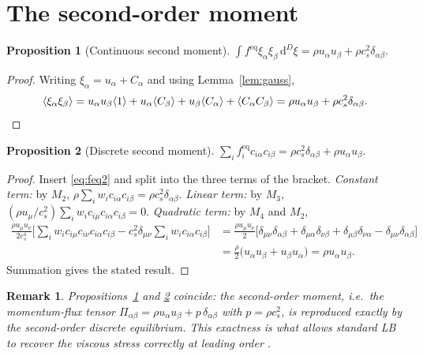 \documentclass[preprint,11pt]{elsarticle}
\newtheorem{proposition}{Proposition}
\newtheorem{remark}{Remark}
\newcommand{\cs}{c_s}
\newcommand{\eq}{\mathrm{eq}}
\newcommand{\dd}{\,\mathrm{d}}
\newcommand{\sumi}{\sum_i}
\begin{document}
\section{The second-order moment}
\label{sec:second}

\begin{proposition}[Continuous second moment]
\label{prop:cont2}
$\displaystyle \int f^{\eq}\xi_\alpha\xi_\beta\dd^{D}\xi
=\rho u_\alpha u_\beta+\rho\cs^{2}\delta_{\alpha\beta}.$
\end{proposition}

\begin{proof}
Writing $\xi_\alpha=u_\alpha+C_\alpha$ and using Lemma~\ref{lem:gauss},
\begin{equation*}
\langle\xi_\alpha\xi_\beta\rangle
=u_\alpha u_\beta\langle 1\rangle
+u_\alpha\langle C_\beta\rangle
+u_\beta\langle C_\alpha\rangle
+\langle C_\alpha C_\beta\rangle
=\rho u_\alpha u_\beta+\rho \cs^{2}\delta_{\alpha\beta}. \qedhere
\end{equation*}
\end{proof}

\begin{proposition}[Discrete second moment]
\label{prop:disc2}
$\displaystyle \sum_i f_i^{\eq}c_{i\alpha}c_{i\beta}
=\rho\cs^{2}\delta_{\alpha\beta}+\rho u_\alpha u_\beta.$
\end{proposition}

\begin{proof}
Insert \eqref{eq:feq2} and split into the three terms of the bracket.
\emph{Constant term:} by $M_2$,
$\rho\sum_i w_i c_{i\alpha}c_{i\beta}=\rho\cs^{2}\delta_{\alpha\beta}$.
\emph{Linear term:} by $M_3$,
$(\rho u_\mu/\cs^{2})\sum_i w_i c_{i\mu}c_{i\alpha}c_{i\beta}=0$.
\emph{Quadratic term:} by $M_4$ and $M_2$,
\begin{align*}
\frac{\rho u_\mu u_\nu}{2\cs^{4}}
\Big[\sumi w_i c_{i\mu}c_{i\nu}c_{i\alpha}c_{i\beta}
-\cs^{2}\delta_{\mu\nu}\sumi w_i c_{i\alpha}c_{i\beta}\Big]
&=\frac{\rho u_\mu u_\nu}{2}
\big[\delta_{\mu\nu}\delta_{\alpha\beta}
+\delta_{\mu\alpha}\delta_{\nu\beta}
+\delta_{\mu\beta}\delta_{\nu\alpha}
-\delta_{\mu\nu}\delta_{\alpha\beta}\big]\\
&=\tfrac{\rho}{2}\big(u_\alpha u_\beta+u_\beta u_\alpha\big)
=\rho u_\alpha u_\beta.
\end{align*}
Summation gives the stated result.
\end{proof}

\begin{remark}
Propositions~\ref{prop:cont2} and \ref{prop:disc2} coincide: the second-order
moment, i.e.\ the momentum-flux tensor
$\Pi_{\alpha\beta}=\rho u_\alpha u_\beta+p\,\delta_{\alpha\beta}$ with
$p=\rho\cs^{2}$, is reproduced \emph{exactly} by the second-order discrete
equilibrium. This exactness is what allows standard LB to recover the viscous
stress correctly at leading order \citep{Kruger2017}.
\end{remark}
\end{document}
